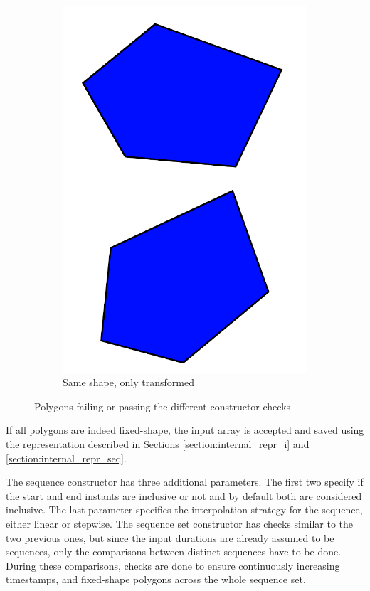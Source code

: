 \begin{figure}[h!]
\begin{subfigure}{.3\textwidth}
        \includegraphics[width=\textwidth]{images/pass_all_tests.pdf}
        \caption{Same shape, only transformed}
    \end{subfigure}
    \caption{Polygons failing or passing the different constructor checks}
    \label{fig:constr_checks}
\end{figure}

If all polygons are indeed fixed-shape, the input array is accepted and saved using the representation described in Sections \ref{section:internal_repr_i} and \ref{section:internal_repr_seq}.

The sequence constructor has three additional parameters. The first two specify if the start and end instants are inclusive or not and by default both are considered inclusive. The last parameter specifies the interpolation strategy for the sequence, either linear or stepwise. The sequence set constructor has checks similar to the two previous ones, but since the input durations are already assumed to be sequences, only the comparisons between distinct sequences have to be done. During these comparisons, checks are done to ensure continuously increasing timestamps, and fixed-shape polygons across the whole sequence set.

